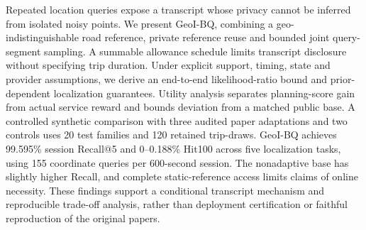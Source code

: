 Repeated location queries expose a transcript whose privacy cannot be inferred from
isolated noisy points. We present GeoI-BQ, combining a geo-indistinguishable road
reference, private reference reuse and bounded joint query-segment sampling.
A summable allowance schedule limits transcript disclosure without specifying trip
duration. Under explicit support, timing, state and provider assumptions, we derive
an end-to-end likelihood-ratio bound and prior-dependent localization guarantees.
Utility analysis separates planning-score gain from actual service reward and bounds
deviation from a matched public base. A controlled synthetic comparison with three
audited paper adaptations and two controls uses 20 test families and 120 retained
trip-draws. GeoI-BQ achieves 99.595\% session Recall@5 and 0--0.188\% Hit100 across
five localization tasks, using 155 coordinate queries per 600-second session.
The nonadaptive base has slightly higher Recall, and complete static-reference
access limits claims of online necessity. These findings support a conditional
transcript mechanism and reproducible trade-off analysis, rather than deployment
certification or faithful reproduction of the original papers.
